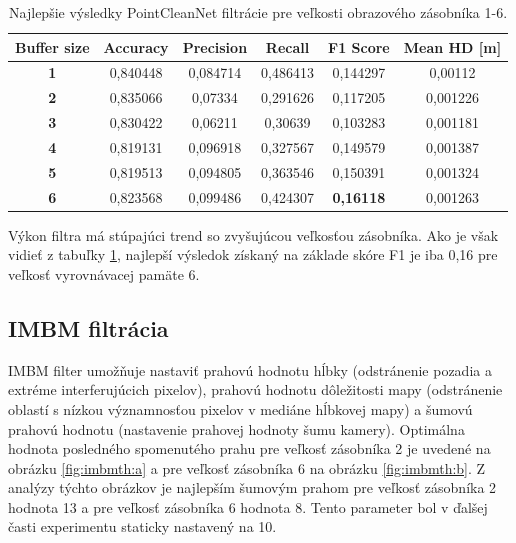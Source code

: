 \begin{table}[h]
	\caption{\label{tab:pcn_best} Najlepšie výsledky PointCleanNet filtrácie pre veľkosti obrazového zásobníka 1-6.}
	\centering
	\begin{tabular}{cccccc}
		\toprule
		\textbf{Buffer size} & \textbf{Accuracy} & \textbf{Precision} & \textbf{Recall} & \textbf{F1 Score} & \textbf{Mean HD [m]} \\ 
		\midrule
		\textbf{1}           & 0,840448          & 0,084714           & 0,486413        & 0,144297          & 0,00112                         \\ 
		\textbf{2}           & 0,835066          & 0,07334            & 0,291626        & 0,117205          & 0,001226                        \\ 
		\textbf{3}           & 0,830422          & 0,06211            & 0,30639         & 0,103283          & 0,001181                        \\ 
		\textbf{4}           & 0,819131          & 0,096918           & 0,327567        & 0,149579          & 0,001387                        \\ 
		\textbf{5}           & 0,819513          & 0,094805           & 0,363546        & 0,150391          & 0,001324                        \\ 
		\textbf{6}           & 0,823568          & 0,099486           & 0,424307        & \textbf{0,16118}           & 0,001263                        \\ 
		\bottomrule
	\end{tabular}
\end{table}

Výkon filtra má stúpajúci trend so zvyšujúcou veľkosťou zásobníka. Ako je však vidieť z tabuľky \ref{tab:pcn_best}, najlepší výsledok získaný na základe skóre F1 je iba 0,16 pre veľkosť vyrovnávacej pamäte 6.

\subsection{IMBM filtrácia}
\label{sec:imbm:filtration}

IMBM filter umožňuje nastaviť prahovú hodnotu hĺbky (odstránenie pozadia a extréme interferujúcich pixelov), prahovú hodnotu dôležitosti mapy (odstránenie oblastí s nízkou významnosťou pixelov v mediáne hĺbkovej mapy) a šumovú prahovú hodnotu (nastavenie prahovej hodnoty šumu kamery). Optimálna hodnota posledného spomenutého prahu pre veľkosť zásobníka 2 je uvedené na obrázku \ref{fig:imbmth:a} a pre veľkosť zásobníka 6 na obrázku \ref {fig:imbmth:b}. Z analýzy týchto obrázkov je najlepším šumovým prahom pre veľkosť zásobníka 2 hodnota 13 a pre veľkosť zásobníka 6 hodnota 8. Tento parameter bol v ďalšej časti experimentu staticky nastavený na 10.


